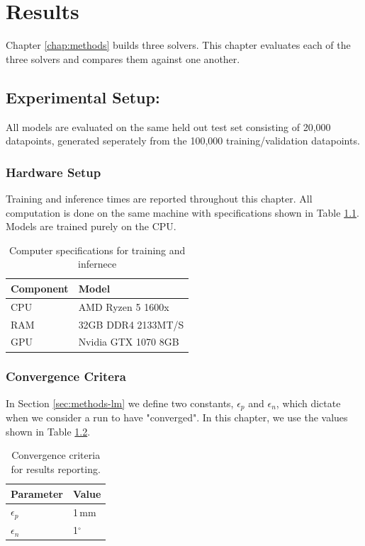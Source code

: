 \chapter{Results}

Chapter \ref{chap:methods} builds three solvers. This chapter evaluates each of the three solvers and compares them against one another. 

\section{Experimental Setup:}
All models are evaluated on the same held out test set consisting of 20,000 datapoints, generated seperately from the 100,000 training/validation datapoints.  


\subsection{Hardware Setup}
Training and inference times are reported throughout this chapter. All computation is done on the same machine with specifications shown in Table \ref{tab:comp_specs}. Models are trained purely on the CPU.

\begin{table}
  \centering
  \begin{tabular}{ll}
    \toprule
    Component & Model \\
    \midrule
    CPU  & AMD Ryzen 5 1600x \\
    RAM  & 32GB DDR4 2133MT/S \\
    GPU & Nvidia GTX 1070 8GB \\
    \bottomrule
  \end{tabular}
  \caption{Computer specifications for training and infernece}
  \label{tab:comp_specs}
\end{table}

\subsection{Convergence Critera}
In Section \ref{sec:methods-lm} we define two constants, $\epsilon_p$ and $\epsilon_n$, which dictate when we consider a run to have "converged". In this chapter, we use the values shown in Table \ref{tab:conv_criteria}.

\begin{table}
  \centering
  \begin{tabular}{ll}
    \toprule
    Parameter & Value \\
    \midrule
    $\epsilon_p$  & 1\,mm \\
    $\epsilon_n$ & 1$^\circ$ \\
    \bottomrule
  \end{tabular}
  \caption{Convergence criteria for results reporting.}
  \label{tab:conv_criteria}
\end{table}

